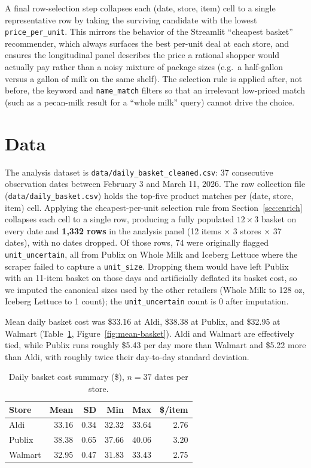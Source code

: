 \documentclass[11pt]{article}
\begin{document}
A final row-selection step collapses each (date, store, item) cell to
a single representative row by taking the surviving candidate with
the lowest \texttt{price\_per\_unit}. This mirrors the behavior of
the Streamlit ``cheapest basket'' recommender, which always surfaces
the best per-unit deal at each store, and ensures the longitudinal
panel describes the price a rational shopper would actually pay
rather than a noisy mixture of package sizes (e.g.\ a half-gallon
versus a gallon of milk on the same shelf). The selection rule is
applied after, not before, the keyword and \texttt{name\_match}
filters so that an irrelevant low-priced match (such as a pecan-milk
result for a ``whole milk'' query) cannot drive the choice.

\section{Data}

The analysis dataset is \texttt{data/daily\_basket\_cleaned.csv}: 37
consecutive observation dates between February 3 and March 11, 2026.
The raw collection file (\texttt{data/daily\_basket.csv}) holds the
top-five product matches per (date, store, item) cell. Applying the
cheapest-per-unit selection rule from Section~\ref{sec:enrich}
collapses each cell to a single row, producing a fully populated
$12 \times 3$ basket on every date and \textbf{1{,}332 rows} in the
analysis panel (12 items $\times$ 3 stores $\times$ 37 dates), with
no dates dropped. Of those rows, 74 were originally flagged
\texttt{unit\_uncertain}, all from Publix on Whole Milk and Iceberg
Lettuce where the scraper failed to capture a \texttt{unit\_size}.
Dropping them would have left Publix with an 11-item basket on those
days and artificially deflated its basket cost, so we imputed the
canonical sizes used by the other retailers (Whole Milk to 128 oz,
Iceberg Lettuce to 1 count); the \texttt{unit\_uncertain} count is 0
after imputation.

Mean daily basket cost was \$33.16 at Aldi, \$38.38 at Publix, and
\$32.95 at Walmart (Table~\ref{tab:basket-summary},
Figure~\ref{fig:mean-basket}). Aldi and Walmart are effectively tied,
while Publix runs roughly \$5.43 per day more than Walmart and \$5.22
more than Aldi, with roughly twice their day-to-day standard
deviation.

\begin{table}[H]
\centering
\caption{Daily basket cost summary (\$), $n = 37$ dates per store.}
\label{tab:basket-summary}
\begin{tabular}{@{}lrrrrr@{}}
\toprule
\textbf{Store} & \textbf{Mean} & \textbf{SD} & \textbf{Min} & \textbf{Max} & \textbf{\$/item} \\
\midrule
Aldi    & 33.16 & 0.34 & 32.32 & 33.64 & 2.76 \\
Publix  & 38.38 & 0.65 & 37.66 & 40.06 & 3.20 \\
Walmart & 32.95 & 0.47 & 31.83 & 33.43 & 2.75 \\
\bottomrule
\end{tabular}
\end{table}
\end{document}
